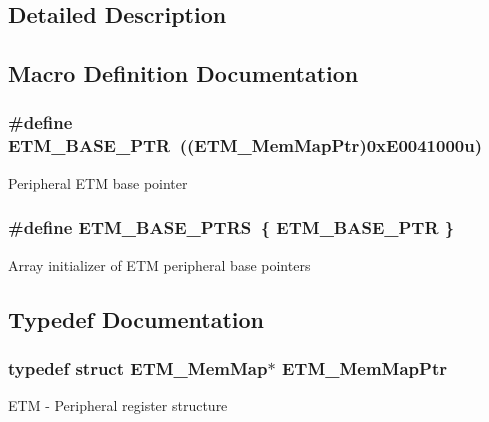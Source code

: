 \subsection{Detailed Description}


\subsection{Macro Definition Documentation}
\hypertarget{group___e_t_m___peripheral_ga5f573e73b1defe379e4a2e666d2e47c7}{}
\subsubsection[{E\+T\+M\+\_\+\+B\+A\+S\+E\+\_\+\+P\+T\+R}]{\setlength{\rightskip}{0pt plus 5cm}\#define E\+T\+M\+\_\+\+B\+A\+S\+E\+\_\+\+P\+T\+R~(({\bf E\+T\+M\+\_\+\+Mem\+Map\+Ptr})0x\+E0041000u)}\label{group___e_t_m___peripheral_ga5f573e73b1defe379e4a2e666d2e47c7}
Peripheral E\+T\+M base pointer \hypertarget{group___e_t_m___peripheral_gaff322b8dea24909f2b9156b5ddcda707}{}
\subsubsection[{E\+T\+M\+\_\+\+B\+A\+S\+E\+\_\+\+P\+T\+R\+S}]{\setlength{\rightskip}{0pt plus 5cm}\#define E\+T\+M\+\_\+\+B\+A\+S\+E\+\_\+\+P\+T\+R\+S~\{ {\bf E\+T\+M\+\_\+\+B\+A\+S\+E\+\_\+\+P\+T\+R} \}}\label{group___e_t_m___peripheral_gaff322b8dea24909f2b9156b5ddcda707}
Array initializer of E\+T\+M peripheral base pointers 

\subsection{Typedef Documentation}
\hypertarget{group___e_t_m___peripheral_ga88a18470aafe4a4922485f18a93c172d}{}
\subsubsection[{E\+T\+M\+\_\+\+Mem\+Map\+Ptr}]{\setlength{\rightskip}{0pt plus 5cm}typedef struct {\bf E\+T\+M\+\_\+\+Mem\+Map}$\ast$ {\bf E\+T\+M\+\_\+\+Mem\+Map\+Ptr}}\label{group___e_t_m___peripheral_ga88a18470aafe4a4922485f18a93c172d}
E\+T\+M -\/ Peripheral register structure 